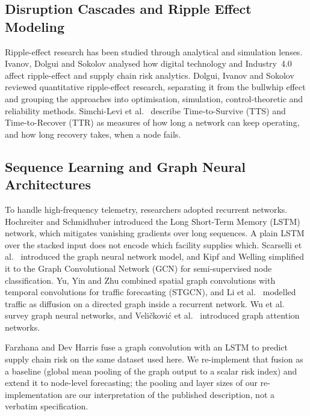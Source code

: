 \documentclass[conference]{IEEEtran}
\begin{document}
\subsection{Disruption Cascades and Ripple Effect Modeling}
Ripple-effect research has been studied through analytical and simulation lenses. Ivanov, Dolgui and Sokolov \cite{r1} analysed how digital technology and Industry~4.0 affect ripple-effect and supply chain risk analytics. Dolgui, Ivanov and Sokolov \cite{r7} reviewed quantitative ripple-effect research, separating it from the bullwhip effect and grouping the approaches into optimisation, simulation, control-theoretic and reliability methods. Simchi-Levi et al.\ \cite{r2} describe Time-to-Survive (TTS) and Time-to-Recover (TTR) as measures of how long a network can keep operating, and how long recovery takes, when a node fails.

\subsection{Sequence Learning and Graph Neural Architectures}
To handle high-frequency telemetry, researchers adopted recurrent networks. Hochreiter and Schmidhuber \cite{r4} introduced the Long Short-Term Memory (LSTM) network, which mitigates vanishing gradients over long sequences. A plain LSTM over the stacked input does not encode which facility supplies which. Scarselli et al.\ \cite{r16} introduced the graph neural network model, and Kipf and Welling \cite{r6} simplified it to the Graph Convolutional Network (GCN) for semi-supervised node classification. Yu, Yin and Zhu \cite{r5} combined spatial graph convolutions with temporal convolutions for traffic forecasting (STGCN), and Li et al.\ \cite{r17} modelled traffic as diffusion on a directed graph inside a recurrent network. Wu et al.\ \cite{r9} survey graph neural networks, and Veli\v{c}kovi\'c et al.\ \cite{r13} introduced graph attention networks.

Farzhana and Dev Harris \cite{r10} fuse a graph convolution with an LSTM to predict supply chain risk on the same dataset used here. We re-implement that fusion as a baseline (global mean pooling of the graph output to a scalar risk index) and extend it to node-level forecasting; the pooling and layer sizes of our re-implementation are our interpretation of the published description, not a verbatim specification.
\end{document}
